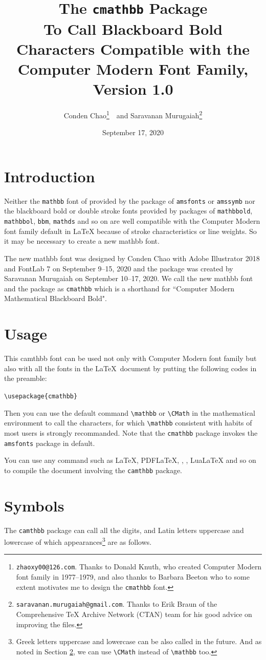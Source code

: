 \documentclass[oneside,a4paper]{article}
\title{The \texttt{cmathbb} Package
	\\\large To Call Blackboard Bold Characters Compatible with the Computer Modern Font Family, Version 1.0}
\author{Conden Chao\thanks{\texttt{zhaoxy00@126.com}. Thanks
			to Donald Knuth, who created Computer Modern font
			family in 1977--1979, and also thanks to Barbara Beeton who to some extent motivates me to design the \texttt{cmathbb} font.}~~and Saravanan Murugaiah\thanks{\texttt{saravanan.murugaiah@gmail.com}. Thanks to Erik Braun of the Comprehensive \TeX{} Archive Network (CTAN) team for his good advice on improving the files.}}
\date{September 17, 2020}
\begin{document}
\maketitle

\section{Introduction}

Neither the \verb|mathbb| font of \AmS{} provided by the package of \verb|amsfonts| or \verb|amssymb| nor the blackboard bold or double stroke fonts provided by packages of \verb|mathbbold|, \verb|mathbbol|, \verb|bbm|, \verb|mathds| and so on are
well compatible with the Computer Modern font family default in
\LaTeX{} because of stroke characteristics or line weights. So it may be necessary to create a new mathbb font.
\par The new mathbb font was designed by Conden Chao with Adobe Illustrator 2018 and FontLab 7 on September 9--15, 2020 and the
package was created by Saravanan Murugaiah on September 10--17, 2020. We call the new mathbb font and the package as \verb|cmathbb| which is a shorthand for ``Computer Modern Mathematical Blackboard Bold".

\section{Usage}\label{CM01}

This camthbb font can be used not only with Computer Modern font family but also with all the fonts in the \LaTeX\ document by putting the following codes in the preamble:
\begin{flushleft}
\verb|\usepackage{cmathbb}|
\end{flushleft}
\noindent Then you can use the default command
\verb|\mathbb| or \verb|\CMath| in the mathematical environment to call the characters, for which \verb|\mathbb| consistent with habits of most users is strongly recommanded. Note that the \verb|cmathbb| package invokes the \verb|amsfonts| package in default.
\par You can use any command such as \LaTeX{}, PDF\LaTeX{}, \XeTeX{}, \XeLaTeX{}, Lua\LaTeX{} and so on to compile the document involving the \verb|camthbb| package.

\section{Symbols}
The \verb|camthbb| package can call all the digits, and Latin letters uppercase and lowercase of which appearances\footnote{Greek letters uppercase and lowercase can be also called in the future. And as noted in Section \ref{CM01}, we can use \texttt{\textbackslash CMath} instead of \texttt{\textbackslash mathbb} too.} are as follows.
\end{document}
